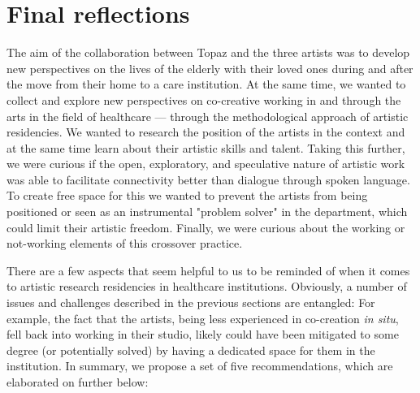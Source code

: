\documentclass[authordate, empirical]{jote-new-article}
\begin{document}
	\section{Final reflections}
	\begin{originalPurpose}
		The aim of the collaboration between Topaz and the three artists was to develop new perspectives on the lives of the elderly with their loved ones during and after the move from their home to a care institution. At the same time, we wanted to collect and explore new perspectives on co-creative working in and through the arts in the field of healthcare — through the methodological approach of artistic residencies. We wanted to research the position of the artists in the context and at the same time learn about their artistic skills and talent. Taking this further, we were curious if the open, exploratory, and speculative nature of artistic work was able to facilitate connectivity better than dialogue through spoken language. To create free space for this we wanted to prevent the artists from being positioned or seen as an instrumental "problem solver" in the department, which could limit their artistic freedom. Finally, we were curious about the working or not-working elements of this crossover practice.
	\end{originalPurpose}


	There are a few aspects that seem helpful to us to be reminded of when it comes to artistic research residencies in healthcare institutions. Obviously, a number of issues and challenges described in the previous sections are entangled: For example, the fact that the artists, being less experienced in co-creation \emph{in situ}, fell back into working in their studio, likely could have been mitigated to some degree (or potentially solved) by having a dedicated space for them in the institution. In summary, we propose a set of five recommendations, which are elaborated on further below:
\end{document}

